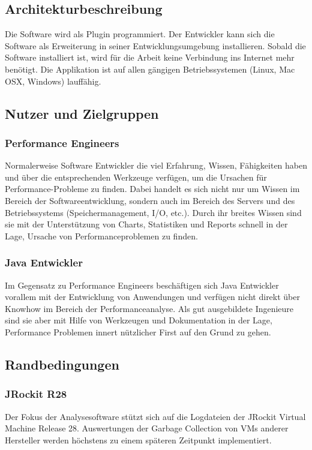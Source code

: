 \subsection{Architekturbeschreibung}
Die Software wird als Plugin programmiert. Der Entwickler kann sich die Software als Erweiterung in seiner Entwicklungsumgebung installieren. Sobald die Software installiert ist, wird für die Arbeit keine Verbindung ins Internet mehr benötigt. Die Applikation ist auf allen gängigen Betriebssystemen (Linux, Mac OSX, Windows) lauffähig.

\subsection{Nutzer und Zielgruppen}
\subsubsection{Performance Engineers}
Normalerweise Software Entwickler die viel Erfahrung, Wissen, Fähigkeiten haben und über die entsprechenden Werkzeuge verfügen, um die Ursachen für Performance-Probleme zu finden. Dabei handelt es sich nicht nur um Wissen im Bereich der Softwareentwicklung, sondern auch im Bereich des Servers und des Betriebssystems (Speichermanagement, I/O, etc.). Durch ihr breites Wissen sind sie mit der Unterstützung von Charts, Statistiken und Reports schnell in der Lage, Ursache von Performanceproblemen zu finden.

\subsubsection{Java Entwickler}
Im Gegensatz zu Performance Engineers beschäftigen sich Java Entwickler vorallem mit der Entwicklung von Anwendungen und verfügen nicht direkt über Knowhow im Bereich der Performanceanalyse. Als gut ausgebildete Ingenieure sind sie aber mit Hilfe von Werkzeugen und Dokumentation in der Lage, Performance Problemen innert nützlicher First auf den Grund zu gehen.

\subsection{Randbedingungen}\label{randbedingungen}
\subsubsection{JRockit R28}
Der Fokus der Analysesoftware stützt sich auf die Logdateien der JRockit Virtual Machine Release 28. Auswertungen der Garbage Collection von VMs anderer Hersteller werden höchstens zu einem späteren Zeitpunkt implementiert. 




